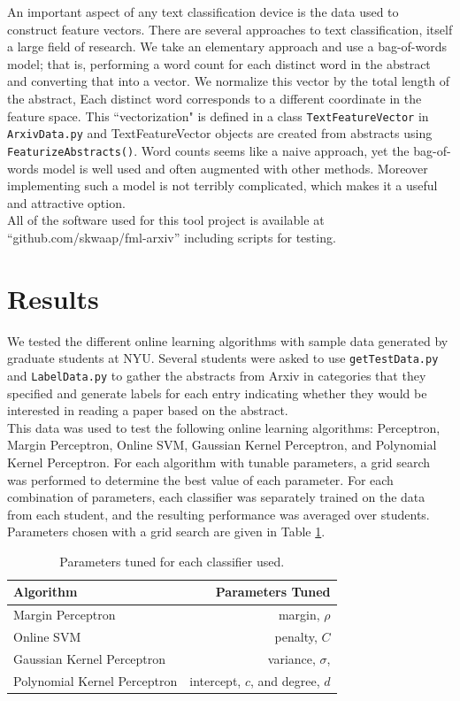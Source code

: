 \documentclass[12pt]{article}
\begin{document}
An important aspect of any text classification device is the data used to construct feature vectors. There are several approaches to text classification, itself a large field of research. We take an elementary approach and use a bag-of-words model; that is, performing a word count for each distinct word in the abstract and converting that into a vector.  We normalize this vector by the total length of the abstract,  
Each distinct word corresponds to a different coordinate in the feature space. This ``vectorization" is defined in a class {\tt TextFeatureVector} in {\tt ArxivData.py} and TextFeatureVector objects are created from abstracts using {\tt FeaturizeAbstracts()}. Word counts seems like a naive approach, yet the bag-of-words model is well used and often augmented with other methods. Moreover implementing such a model is not terribly complicated, which makes it a useful and attractive option.   \\
All of the software used for this tool project is available at ``github.com/skwaap/fml-arxiv'' including scripts for testing.\\


\section{Results}
\label{sec:results}

We tested the different online learning algorithms with sample data generated by graduate students at NYU.  Several students were asked to use {\tt getTestData.py} and {\tt LabelData.py} to gather the abstracts from Arxiv in categories that they specified and generate labels for each entry indicating whether they would be interested in reading a paper based on the abstract.\\

This data was used to test the following online learning algorithms: Perceptron, Margin Perceptron, Online SVM, Gaussian Kernel Perceptron, and Polynomial Kernel Perceptron.  For each algorithm with tunable parameters, a grid search was performed to determine the best value of each parameter. For each combination of parameters, each classifier was separately trained on the data from each student, and the resulting performance was averaged over students.  Parameters chosen with a grid search are given in Table \ref{tab:parametertable}.  \\
\begin{table}[h]
\centering
\begin{tabular}{l | r}
Algorithm & Parameters Tuned \\
\hline
Margin Perceptron &  margin, $\rho$  \\
Online SVM & penalty, $C$ \\
Gaussian Kernel Perceptron &  variance, $\sigma$, \\
Polynomial Kernel Perceptron &  intercept, $c$, and degree, $d$ \\
\hline
\end{tabular} 
\caption{Parameters tuned for each classifier used.}
\label{tab:parametertable}
\end{table}
\end{document}
